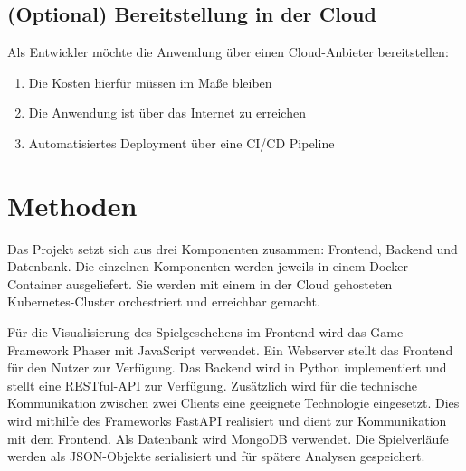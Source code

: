 \documentclass[a4paper, 10pt, conference]{IEEEtran}
\begin{document}
\subsection{(Optional) Bereitstellung in der Cloud}
Als Entwickler möchte die Anwendung über einen Cloud-Anbieter bereitstellen:
\begin{enumerate}
	\item Die Kosten hierfür müssen im Maße bleiben
	\item Die Anwendung ist über das Internet zu erreichen
	\item Automatisiertes Deployment über eine CI/CD Pipeline
\end{enumerate}

\section{Methoden}\label{sec:methoden}

Das Projekt setzt sich aus drei Komponenten zusammen: Frontend, Backend und Datenbank.
Die einzelnen Komponenten werden jeweils in einem Docker-Container \cite{docker} ausgeliefert.
Sie werden mit einem in der Cloud gehosteten Kubernetes-Cluster \cite{kubernetes} orchestriert und erreichbar gemacht.

Für die Visualisierung des Spielgeschehens im Frontend wird das Game Framework Phaser \cite{phaser} mit JavaScript verwendet. 
Ein Webserver stellt das Frontend für den Nutzer zur Verfügung.
Das Backend wird in Python implementiert und stellt eine RESTful-API zur Verfügung. Zusätzlich wird für die technische Kommunikation zwischen zwei Clients eine geeignete Technologie eingesetzt.
Dies wird mithilfe des Frameworks FastAPI \cite{fastapi} realisiert und dient zur Kommunikation mit dem Frontend.
Als Datenbank wird MongoDB \cite{mongodb} verwendet. Die Spielverläufe werden als JSON-Objekte serialisiert und für spätere Analysen gespeichert.

\printbibliography
\end{document}
